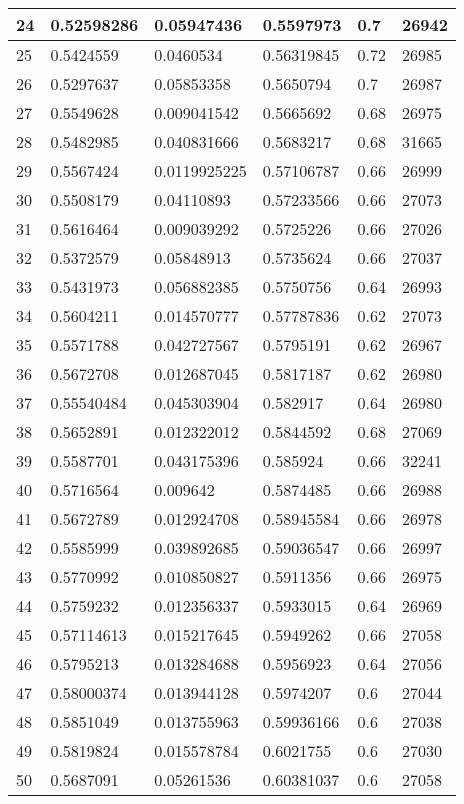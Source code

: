 \begin{longtable}{|l|l|l|l|l|l|}
24 & 0.52598286 & 0.05947436 & 0.5597973 & 0.7 & 26942 \\ \hline 
25 & 0.5424559 & 0.0460534 & 0.56319845 & 0.72 & 26985 \\ \hline 
26 & 0.5297637 & 0.05853358 & 0.5650794 & 0.7 & 26987 \\ \hline 
27 & 0.5549628 & 0.009041542 & 0.5665692 & 0.68 & 26975 \\ \hline 
28 & 0.5482985 & 0.040831666 & 0.5683217 & 0.68 & 31665 \\ \hline 
29 & 0.5567424 & 0.0119925225 & 0.57106787 & 0.66 & 26999 \\ \hline 
30 & 0.5508179 & 0.04110893 & 0.57233566 & 0.66 & 27073 \\ \hline 
31 & 0.5616464 & 0.009039292 & 0.5725226 & 0.66 & 27026 \\ \hline 
32 & 0.5372579 & 0.05848913 & 0.5735624 & 0.66 & 27037 \\ \hline 
33 & 0.5431973 & 0.056882385 & 0.5750756 & 0.64 & 26993 \\ \hline 
34 & 0.5604211 & 0.014570777 & 0.57787836 & 0.62 & 27073 \\ \hline 
35 & 0.5571788 & 0.042727567 & 0.5795191 & 0.62 & 26967 \\ \hline 
36 & 0.5672708 & 0.012687045 & 0.5817187 & 0.62 & 26980 \\ \hline 
37 & 0.55540484 & 0.045303904 & 0.582917 & 0.64 & 26980 \\ \hline 
38 & 0.5652891 & 0.012322012 & 0.5844592 & 0.68 & 27069 \\ \hline 
39 & 0.5587701 & 0.043175396 & 0.585924 & 0.66 & 32241 \\ \hline 
40 & 0.5716564 & 0.009642 & 0.5874485 & 0.66 & 26988 \\ \hline 
41 & 0.5672789 & 0.012924708 & 0.58945584 & 0.66 & 26978 \\ \hline 
42 & 0.5585999 & 0.039892685 & 0.59036547 & 0.66 & 26997 \\ \hline 
43 & 0.5770992 & 0.010850827 & 0.5911356 & 0.66 & 26975 \\ \hline 
44 & 0.5759232 & 0.012356337 & 0.5933015 & 0.64 & 26969 \\ \hline 
45 & 0.57114613 & 0.015217645 & 0.5949262 & 0.66 & 27058 \\ \hline 
46 & 0.5795213 & 0.013284688 & 0.5956923 & 0.64 & 27056 \\ \hline 
47 & 0.58000374 & 0.013944128 & 0.5974207 & 0.6 & 27044 \\ \hline 
48 & 0.5851049 & 0.013755963 & 0.59936166 & 0.6 & 27038 \\ \hline 
49 & 0.5819824 & 0.015578784 & 0.6021755 & 0.6 & 27030 \\ \hline 
50 & 0.5687091 & 0.05261536 & 0.60381037 & 0.6 & 27058 \\ \hline 
\end{longtable}